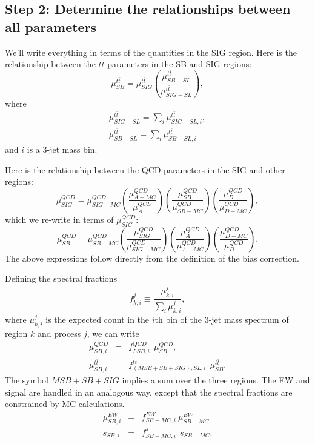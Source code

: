 \documentclass[11pt]{article}
\begin{document}
    \subsection{Step 2: Determine the relationships between all parameters}
    
    We'll write everything in terms of the quantities in the SIG region.
    Here is the relationship between the $t\bar{t}$ parameters in the SB and SIG regions:
    \begin{equation}
    \mu_{SB}^{t\bar{t}} = \mu_{SIG}^{t\bar{t}} \left( \frac{\mu_{SB-SL}^{t\bar{t}}}{\mu_{SIG-SL}^{t\bar{t}}} \right),
    \end{equation}
    where
    \begin{eqnarray}
    \mu_{SIG-SL}^{t\bar{t}} = \sum_i \mu_{SIG-SL,i}^{t\bar{t}}, \\
    \mu_{SB-SL}^{t\bar{t}} = \sum_i \mu_{SB-SL,i}^{t\bar{t}} 
    \end{eqnarray}
    and $i$ is a 3-jet mass bin.
    
    Here is the relationship between the QCD parameters in the SIG and other regions:
    \begin{equation}
    \mu_{SIG}^{QCD} = \mu_{SIG-MC}^{QCD} \left(\frac{\mu_{A-MC}^{QCD}}{\mu_{A}^{QCD}} \right) \left(\frac{\mu_{SB}^{QCD}}{\mu_{SB-MC}^{QCD}} \right) \left(\frac{\mu_{D}^{QCD}}{\mu_{D-MC}^{QCD}} \right),
    \end{equation}
    which we re-write in terms of $\mu_{SIG}^{QCD}$:
    \begin{equation}
    \mu_{SB}^{QCD} = \mu_{SB-MC}^{QCD} \left(\frac{\mu_{SIG}^{QCD}}{\mu_{SIG-MC}^{QCD}} \right) \left(\frac{\mu_{A}^{QCD}}{\mu_{A-MC}^{QCD}} \right) \left(\frac{\mu_{D-MC}^{QCD}}{\mu_{D}^{QCD}} \right).
    \end{equation}
    The above expressions follow directly from the definition of the bias correction.
    
    Defining the spectral fractions 
    \begin{equation}
    f_{k,i}^{j} \equiv \frac{\mu_{k,i}^{j}}{\sum_{i} \mu_{k,i}^{j}},
    \end{equation}
    where $\mu_{k,i}^{j}$ is the expected count in the $i$th bin of the 3-jet mass spectrum of region $k$ and process $j$,
    we can write
    \begin{eqnarray}
    \mu_{SB,i}^{QCD} & = & f_{LSB,i}^{QCD} \ \ \mu_{SB}^{QCD}, \\
    \mu_{SB,i}^{t\bar{t}} & = & f_{(MSB+SB+SIG),SL,i}^{t\bar{t}} \ \ \mu_{SB}^{t\bar{t}}. 
    \end{eqnarray}
    The symbol $MSB+SB+SIG$ implies a sum over the three regions.
    The EW and signal are handled in an analogous way, except that the spectral fractions are constrained by MC calculations.
    \begin{eqnarray}
    \mu_{SB,i}^{EW} & = & f_{SB-MC,i}^{EW} \ \mu_{SB-MC}^{EW} \\
    s_{SB,i} & = & f_{SB-MC,i}^{s} \ \ s_{SB-MC}. 
    \end{eqnarray}
    
\end{document}
